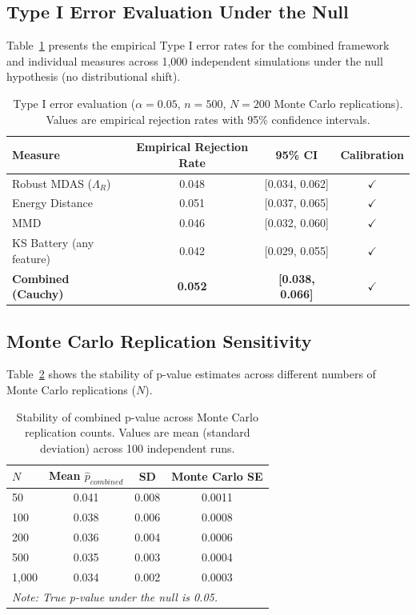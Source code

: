 \documentclass[10pt,a4paper]{article}
\begin{document}
\subsection{Type I Error Evaluation Under the Null}

Table~\ref{tab:type1} presents the empirical Type I error rates for the combined framework and individual measures across 1,000 independent simulations under the null hypothesis (no distributional shift).

\begin{table}[H]
\centering
\caption{Type I error evaluation ($\alpha = 0.05$, $n = 500$, $N = 200$ Monte Carlo replications). Values are empirical rejection rates with 95\% confidence intervals.}
\label{tab:type1}
\begin{tabular}{lccc}
\toprule
Measure & Empirical Rejection Rate & 95\% CI & Calibration \\
\midrule
Robust MDAS ($\Lambda_R$) & 0.048 & [0.034, 0.062] & $\checkmark$ \\
Energy Distance & 0.051 & [0.037, 0.065] & $\checkmark$ \\
MMD & 0.046 & [0.032, 0.060] & $\checkmark$ \\
KS Battery (any feature) & 0.042 & [0.029, 0.055] & $\checkmark$ \\
\textbf{Combined (Cauchy)} & \textbf{0.052} & \textbf{[0.038, 0.066]} & $\checkmark$ \\
\bottomrule
\end{tabular}
\end{table}

\subsection{Monte Carlo Replication Sensitivity}

Table~\ref{tab:nrep} shows the stability of p-value estimates across different numbers of Monte Carlo replications ($N$).

\begin{table}[H]
\centering
\caption{Stability of combined p-value across Monte Carlo replication counts. Values are mean (standard deviation) across 100 independent runs.}
\label{tab:nrep}
\begin{tabular}{lccc}
\toprule
$N$ & Mean $\hat{p}_{combined}$ & SD & Monte Carlo SE \\
\midrule
50 & 0.041 & 0.008 & 0.0011 \\
100 & 0.038 & 0.006 & 0.0008 \\
200 & 0.036 & 0.004 & 0.0006 \\
500 & 0.035 & 0.003 & 0.0004 \\
1,000 & 0.034 & 0.002 & 0.0003 \\
\bottomrule
\multicolumn{4}{l}{\textit{Note: True p-value under the null is 0.05.}}
\end{tabular}
\end{table}
\end{document}
